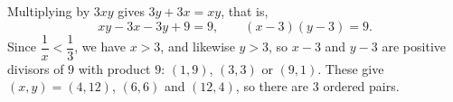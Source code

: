 Multiplying by $3xy$ gives $3y+3x=xy$, that is,
\[xy-3x-3y+9=9,\qquad (x-3)(y-3)=9 .\]
Since $\dfrac{1}{x}<\dfrac{1}{3}$, we have $x>3$, and likewise $y>3$, so $x-3$ and $y-3$ are positive divisors of $9$ with product $9$: $(1,9)$, $(3,3)$ or $(9,1)$. These give $(x,y)=(4,12)$, $(6,6)$ and $(12,4)$, so there are $\boxed{3}$ ordered pairs.
